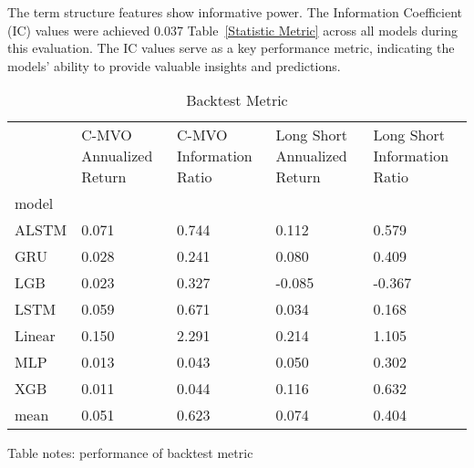\documentclass[10pt,letterpaper]{article}
\begin{document}
The term structure features show informative power. The Information Coefficient (IC) values were achieved 0.037 Table~\ref{Statistic Metric} across all models during this evaluation. The IC values serve as a key performance metric, indicating the models' ability to provide valuable insights and predictions.


\begin{table}[!ht]
\centering
\caption{Backtest Metric}
\label{Backtest Metric}
\begin{tabular}{lp{1.5cm}p{1.5cm}p{1.5cm}p{1.5cm}}
\toprule
{} &  C-MVO Annualized Return &  C-MVO Information Ratio &  Long Short Annualized Return &  Long Short Information Ratio \\
model  &                          &                          &                               &                               \\
\midrule
ALSTM  &                    0.071 &                    0.744 &                         0.112 &                         0.579 \\
GRU    &                    0.028 &                    0.241 &                         0.080 &                         0.409 \\
LGB    &                    0.023 &                    0.327 &                        -0.085 &                        -0.367 \\
LSTM   &                    0.059 &                    0.671 &                         0.034 &                         0.168 \\
Linear &                    0.150 &                    2.291 &                         0.214 &                         1.105 \\
MLP    &                    0.013 &                    0.043 &                         0.050 &                         0.302 \\
XGB    &                    0.011 &                    0.044 &                         0.116 &                         0.632 \\
mean   &                    0.051 &                    0.623 &                         0.074 &                         0.404 \\
\bottomrule
\end{tabular}



\begin{flushleft}
Table notes: performance of backtest metric
\end{flushleft}
\label{table1}

\end{table}
\end{document}
